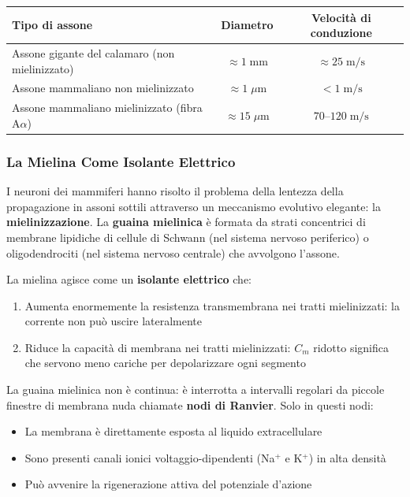 \begin{table}[htbp]
    \centering
    \renewcommand{\arraystretch}{1.3}
    \begin{tabularx}{\textwidth}{|>{\raggedright\arraybackslash}X|c|c|}
    \hline
    \textbf{Tipo di assone} & \textbf{Diametro} & \textbf{Velocità di conduzione} \\
    \hline
    Assone gigante del calamaro (non mielinizzato) & $\approx 1 \; \text{mm}$ & $\approx 25 \; \text{m/s}$ \\
    \hline
    Assone mammaliano non mielinizzato & $\approx 1 \; \mu\text{m}$ & $< 1 \; \text{m/s}$ \\
    \hline
    Assone mammaliano mielinizzato (fibra A$\alpha$) & $\approx 15 \; \mu\text{m}$ & $70$–$120 \; \text{m/s}$ \\
    \hline
    \end{tabularx}
\end{table}


\subsubsection{La Mielina Come Isolante Elettrico}

I neuroni dei mammiferi hanno risolto il problema della lentezza della propagazione in assoni sottili attraverso un meccanismo evolutivo elegante: la \textbf{mielinizzazione}. La \textbf{guaina mielinica} è formata da strati concentrici di membrane lipidiche di cellule di Schwann (nel sistema nervoso periferico) o oligodendrociti (nel sistema nervoso centrale) che avvolgono l'assone.

La mielina agisce come un \textbf{isolante elettrico} che:
\begin{enumerate}
    \item Aumenta enormemente la resistenza transmembrana nei tratti mielinizzati: la corrente non può uscire lateralmente
    \item Riduce la capacità di membrana nei tratti mielinizzati: $C_m$ ridotto significa che servono meno cariche per depolarizzare ogni segmento
\end{enumerate}


La guaina mielinica non è continua: è interrotta a intervalli regolari da piccole finestre di membrana nuda chiamate \textbf{nodi di Ranvier}. Solo in questi nodi:
\begin{itemize}
    \item La membrana è direttamente esposta al liquido extracellulare
    \item Sono presenti canali ionici voltaggio-dipendenti (Na$^+$ e K$^+$) in alta densità
    \item Può avvenire la rigenerazione attiva del potenziale d'azione
\end{itemize}




